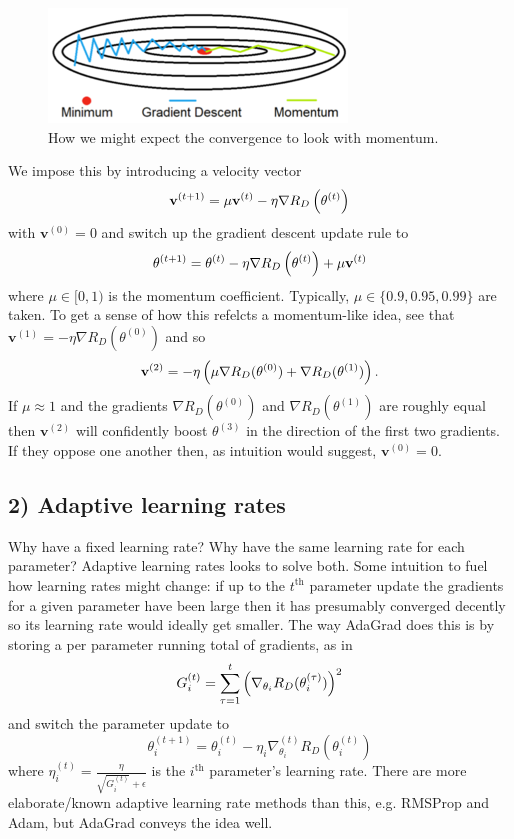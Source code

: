 \documentclass[11pt]{article}
\begin{document}
\begin{figure}[t]
    \centering
    \includegraphics[width=\columnwidth]{./figures/gradient_descent/momentum.png}
    \caption{How we might expect the convergence to look with momentum. }
    \label{fig:gradient_descent_momentum}
\end{figure}

We impose this by introducing a velocity vector
$$
\mathbf{v}^{(t+1)}=\mu\mathbf{v}^{(t)}-\eta\nabla R_D\left(\theta^{(t)}\right)
$$
with $\mathbf{v}^{(0)}=0$ and switch up the gradient descent update rule to
$$
\theta^{(t+1)}
=
\theta^{(t)}-\eta\nabla R_D\left(\theta^{(t)}\right)+\mu\mathbf{v}^{(t)}
$$
where $\mu\in[0,1)$ is the momentum coefficient. Typically, $\mu\in\{0.9,0.95,0.99\}$ are taken. To get a sense of how this refelcts a momentum-like idea, see that $\mathbf{v}^{(1)}=-\eta\nabla R_D(\theta^{(0)})$ and so
$$
\mathbf{v}^{(2)}
=
-\eta\left(\mu\nabla R_D(\theta^{(0)})+\nabla R_D(\theta^{(1)})\right).
$$
If $\mu\approx1$ and the gradients $\nabla R_D(\theta^{(0)})$ and $\nabla R_D(\theta^{(1)})$ are roughly equal then $\mathbf{v}^{(2)}$ will confidently boost $\theta^{(3)}$ in the direction of the first two gradients. If they oppose one another then, as intuition would suggest, $\mathbf{v}^{(0)}=0$.

\subsection*{2) Adaptive learning rates}
Why have a fixed learning rate? Why have the same learning rate for each parameter? Adaptive learning rates looks to solve both. Some intuition to fuel how learning rates might change: if up to the $t^{\text{th}}$ parameter update the gradients for a given parameter have been large then it has presumably converged decently so its learning rate would ideally get smaller. The way AdaGrad does this is by storing a per parameter running total of gradients, as in
$$
G_i^{(t)}
=
\sum_{\tau=1}^t\left(\nabla_{\theta_i}R_D(\theta_i^{(\tau)})\right)^2
$$
and switch the parameter update to
$$
\theta_i^{(t+1)}
=
\theta_i^{(t)}-\eta_i\nabla_{\theta_i}^{(t)}R_D(\theta_i^{(t)})
$$
where $\eta_i^{(t)}=\frac{\eta}{\sqrt{G_i^{(t)}}+\epsilon}$ is the $i^{\text{th}}$ parameter's learning rate. There are more elaborate/known adaptive learning rate methods than this, e.g. RMSProp and Adam, but AdaGrad conveys the idea well.
\end{document}
